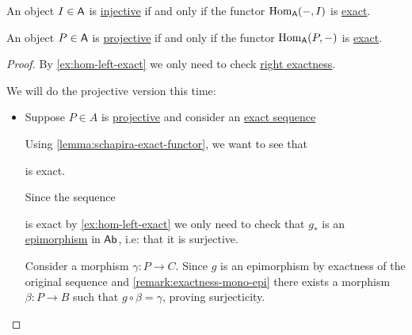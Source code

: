 \documentclass[../../../main]{subfiles}
\begin{document}
\begin{proposition}
  An object \(I \in \mathsf{A}\) is \hyperref[def:injective-projective-objects]{injective} if and only if the functor \(\operatorname{Hom}_{\mathsf{A}}(-, I)\) is \hyperref[def:exact-functor]{exact}.

  An object \(P \in \mathsf{A}\) is \hyperref[def:injective-projective-objects]{projective} if and only if the functor \(\operatorname{Hom}_{\mathsf{A}}(P, -)\) is \hyperref[def:exact-functor]{exact}.
\end{proposition}
\begin{proof}
  By \autoref{ex:hom-left-exact} we only need to check \hyperref[def:exact-functor]{right exactness}.

  We will do the projective version this time:
  \begin{itemize}
    \item[\(\implies\)] Suppose \(P \in A\) is \hyperref[def:injective-projective-objects]{projective} and consider an \hyperref[def:short-exact-sequence]{exact sequence}
          \begin{center}
          \end{center}
        Using \autoref{lemma:schapira-exact-functor}, we want to see that
          \begin{center}
          \end{center}
          is exact.

          Since the sequence
          \begin{center}
          \end{center}
          is exact by \autoref{ex:hom-left-exact} we only need to check that \(g_{\ast}\) is an \hyperref[def:mono-epi-morphism]{epimorphism} in \(\mathsf{Ab}\), i.e: that it is surjective.

          Consider a morphism \(\gamma: P \to C\).
          Since \(g\) is an epimorphism by exactness of the original sequence and \autoref{remark:exactness-mono-epi} there exists a morphism \(\beta: P \to B\) such that \(g \circ \beta = \gamma\), proving surjecticity.


\end{itemize}
\end{proof}
\end{document}
